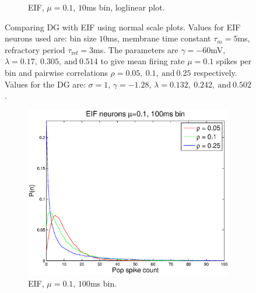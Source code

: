 \documentclass[11pt]{article}
\begin{document}
\begin{figure}[H]
\begin{subfigure}[h]{0.5\textwidth}
	\caption{\footnotesize EIF, $\mu = 0.1$, $10$ms bin, loglinear plot.}
	\label{fig4}
	\end{subfigure}
	\caption{\footnotesize Comparing DG with EIF using normal scale plots. Values for EIF neurons used are: bin size $10$ms, membrane time constant $\tau_m = 5$ms, refractory period $\tau_\text{ref} = 3$ms. The parameters are $\gamma = -60$mV, $\lambda = 0.17,~0.305,~\text{and}~0.514$ to give mean firing rate $\mu = 0.1$ spikes per bin and pairwise correlations $\rho = 0.05,~0.1,~\text{and}~0.25$ respectively. Values for the DG are: $\sigma = 1$, $\gamma = -1.28$, $\lambda = 0.132,~0.242,~\text{and}~0.502$.}
\end{figure}

\begin{figure}[H]
	\begin{subfigure}[h]{0.5\textwidth}
	\centering
	\includegraphics[width=\textwidth]{../Figures/EIF/EIF_Macke_2a_100ms}
	\caption{\footnotesize EIF, $\mu = 0.1$, $100$ms bin.}
	\label{fig5}
	\end{subfigure}
	\begin{subfigure}[h]{0.5\textwidth}
	\centering

\end{subfigure}
\end{figure}
\end{document}
